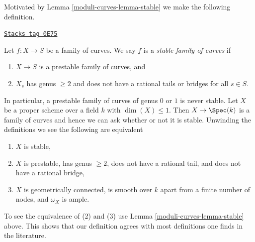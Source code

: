 Motivated by Lemma \ref{moduli-curves-lemma-stable} we make the following definition.

\begin{definition}[Stable]
\label{moduli-curves-definition-stable}
\href{https://stacks.math.columbia.edu/tag/0E75}{\texttt{Stacks tag 0E75}}

Let $f : X \to S$ be a family of curves.
We say $f$ is a {\it stable family of curves} if
\begin{enumerate}
\item $X \to S$ is a prestable family of curves, and
\item $X_s$ has genus $\geq 2$ and does not have a rational tails
or bridges for all $s \in S$.
\end{enumerate}
\end{definition}

In particular, a prestable family of curves of genus $0$ or $1$ is never
stable.
Let $X$ be a proper scheme over a field $k$ with $\dim(X) \leq 1$.
Then $X \to \Spec(k)$ is a family of curves and hence we can ask
whether or not it is stable. Unwinding the definitions we see
the following are equivalent
\begin{enumerate}
\item $X$ is stable,
\item $X$ is prestable, has genus $\geq 2$, does not have a rational tail,
and does not have a rational bridge,
\item $X$ is geometrically connected, is smooth over $k$
apart from a finite number of nodes, and $\omega_X$ is ample.
\end{enumerate}
To see the equivalence of (2) and (3) use
Lemma \ref{moduli-curves-lemma-stable} above.
This shows that our definition agrees with most definitions one finds
in the literature.

